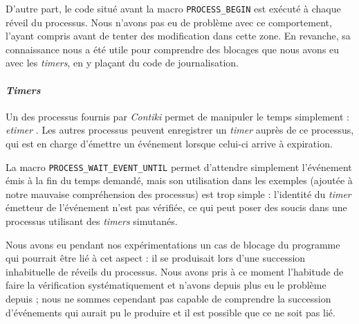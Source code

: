 D’autre part, le code situé avant la macro \texttt{PROCESS\_BEGIN} est exécuté à chaque réveil du processus.
Nous n’avons pas eu de problème avec ce comportement, l’ayant compris avant de tenter des modification dans cette zone.
En revanche, sa connaissance nous a été utile pour comprendre des blocages que nous avons eu avec les \emph{timers}, en y plaçant du code de journalisation.

\paragraph{\emph{Timers}}

Un des processus fournis par \emph{Contiki} permet de manipuler le temps simplement : \emph{etimer} .
Les autres processus peuvent enregistrer un \emph{timer} auprès de ce processus, qui est en charge d’émettre un événement lorsque celui-ci arrive à expiration.

La macro \texttt{PROCESS\_WAIT\_EVENT\_UNTIL} permet d’attendre simplement l’événement émis à la fin du temps demandé, mais son utilisation dans les exemples (ajoutée à notre mauvaise compréhension des processus) est trop simple : l’identité du \textit{timer} émetteur de l’événement n’est pas vérifiée, ce qui peut poser des soucis dans une processus utilisant des \textit{timers} simutanés.

Nous avons eu pendant nos expérimentations un cas de blocage du programme qui pourrait être lié à cet aspect : il se produisait lors d’une succession inhabituelle de réveils du processus.
Nous avons pris à ce moment l’habitude de faire la vérification systématiquement et n’avons depuis plus eu le problème depuis ; nous ne sommes cependant pas capable de comprendre la succession d’événements qui aurait pu le produire et il est possible que ce ne soit pas lié.

